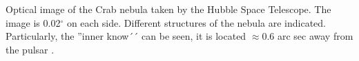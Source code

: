 Optical image of the Crab nebula taken by the Hubble Space Telescope. The image is 0.02$^\circ$ on each side. Different structures of the nebula are indicated. Particularly, the ''inner know´´ can be seen, it is located $\approx 0.6$ arc sec away from the pulsar \cite{rudy2015}.